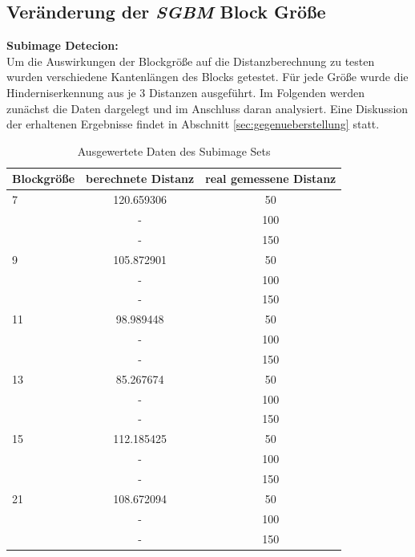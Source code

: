 \noindent
\subsection{Veränderung der \emph{SGBM} Block Größe}
\label{subsec:block_size_change}

\textbf{Subimage Detecion:}\\
\noindent
Um die Auswirkungen der Blockgröße auf die Distanzberechnung zu testen wurden verschiedene Kantenlängen des Blocks getestet. Für jede Größe wurde die Hinderniserkennung aus je 3 Distanzen ausgeführt. Im Folgenden werden zunächst die Daten dargelegt und im Anschluss daran analysiert. Eine Diskussion der erhaltenen Ergebnisse findet in Abschnitt \ref{sec:gegenueberstellung} statt.\\
	
\begin{table}[h]
\centering
\begin{tabular}{|l||c|c|}
\hline
Blockgröße & berechnete Distanz & real gemessene Distanz \\
\hline\hline
7          & 120.659306         & 50                     \\
           &  -                 & 100                    \\
           &  -                 & 150                    \\
\hline
9          & 105.872901         & 50                     \\
           &  -                 & 100                    \\
           &  -                 & 150                    \\
\hline
11         & 98.989448          & 50                     \\
           &  -                 & 100                    \\
           &  -                 & 150                    \\
\hline
13         & 85.267674          & 50                     \\
           &  -                 & 100                    \\
           &  -                 & 150                    \\
\hline
15         & 112.185425         & 50                     \\
           &  -                 & 100                    \\
           &  -                 & 150                    \\
\hline
21         & 108.672094         & 50                     \\
           &  -                 & 100                    \\
           &  -                 & 150                    \\
\hline
\end{tabular}
\caption{Ausgewertete Daten des Subimage Sets}
\label{tbl:distance_subimage}
\end{table}	

